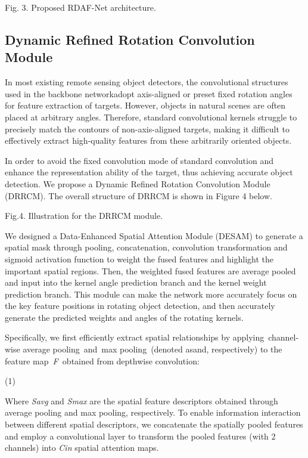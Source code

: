 \documentclass[10pt,twocolumn,final]{article}
\begin{document}
Fig. 3. Proposed RDAF-Net architecture.

\subsection{ Dynamic Refined Rotation Convolution Module }

In most existing remote sensing object detectors, the convolutional structures used in the backbone networkadopt axis-aligned or preset fixed rotation angles for feature extraction of targets. However, objects in natural scenes are often placed at arbitrary angles. Therefore, standard convolutional kernels struggle to precisely match the contours of non-axis-aligned targets, making it difficult to effectively extract high-quality features from these arbitrarily oriented objects.

In order to avoid the fixed convolution mode of standard convolution and enhance the representation ability of the target, thus achieving accurate object detection. We propose a Dynamic Refined Rotation Convolution Module (DRRCM). The overall structure of DRRCM is shown in Figure 4 below.

Fig.4. Illustration for the DRRCM module.

We designed a Data-Enhanced Spatial Attention Module (DESAM) to generate a spatial mask through pooling, concatenation, convolution transformation and sigmoid activation function to weight the fused features and highlight the important spatial regions. Then, the weighted fused features are average pooled and input into the kernel angle prediction branch and the kernel weight prediction branch. This module can make the network more accurately focus on the key feature positions in rotating object detection, and then accurately generate the predicted weights and angles of the rotating kernels.

Specifically, we first efficiently extract spatial relationships by applying channel-wise average pooling and max pooling (denoted asand, respectively) to the feature map \textit{F }obtained from depthwise convolution:

	(1)

Where \textit{S}\textit{avg} and \textit{S}\textit{max} are the spatial feature descriptors obtained through average pooling and max pooling, respectively. To enable information interaction between different spatial descriptors, we concatenate the spatially pooled features and employ a convolutional layer to transform the pooled features (with 2 channels) into \textit{C}\textit{in} spatial attention maps.
\end{document}
